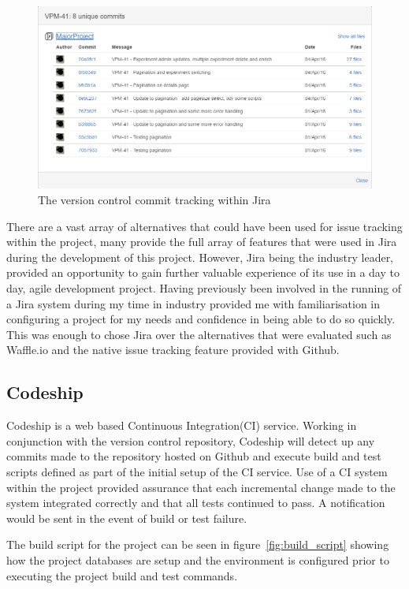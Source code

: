 \begin{figure}[H]
    \centering
    \includegraphics[width=\textwidth]{images/tools/jira_commit}
    \caption{The version control commit tracking within Jira}
    \label{fig:jira_commit}
\end{figure} 

There are a vast array of alternatives that could have been used for issue tracking within the project, many provide the full array of features that were used in Jira during the development of this project. However, Jira being the industry leader, provided an opportunity to gain further valuable experience of its use in a day to day, agile development project. Having previously been involved in the running of a Jira system during my time in industry provided me with familiarisation in configuring a project for my needs and confidence in being able to do so quickly. This was enough to chose Jira over the alternatives that were evaluated such as Waffle.io and the native issue tracking feature provided with Github.

\subsection{Codeship} 
Codeship\cite{_codeship} is a web based Continuous Integration(CI) service. Working in conjunction with the version control repository, Codeship will detect up any commits made to the repository hosted on Github and execute build and test scripts defined as part of the initial setup of the CI service. Use of a CI system within the project provided assurance that each incremental change made to the system integrated correctly and that all tests continued to pass. A notification would be sent in the event of build or test failure.  

 The build script for the project can be seen in figure~\ref{fig:build_script} showing how the project databases are setup and the environment is configured prior to executing the project build and test commands.

